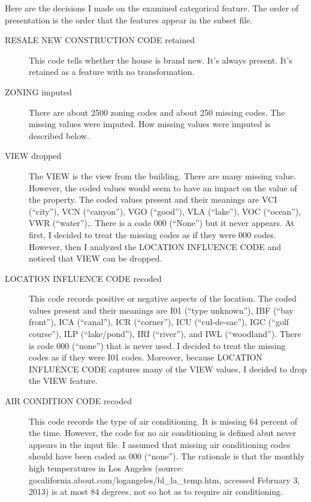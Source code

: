 Here are the decisions I made on the examined categorical
feature. The order of presentation is the order that the features
appear in the subset file.
\begin{description}

\item[RESALE NEW CONSTRUCTION CODE retained] This code tells whether
  the house is brand new. It's always present. It's retained as a
  feature with no transformation.

\item[ZONING imputed] There are about 2500 zoning codes and about 250 missing
  codes. The missing values were imputed. How missing values were imputed
  is described below.

\item[VIEW dropped] The VIEW is the view from the building. There are
  many missing value. However, the coded values would seem to have an
  impact on the value of the property. The coded values present and
  their meanings are VCI (``city''), VCN (``canyon''), VGO (``good''),
  VLA (``lake''), VOC (``ocean''), VWR (``water''),. There is a code
  000 (``None'') but it never appears. At first, I decided to treat
  the missing codes as if they were 000 codes. However, then I
  analyzed the LOCATION INFLUENCE CODE and noticed that VIEW can be
  dropped.

\item[LOCATION INFLUENCE CODE recoded] This code records positive or
  negative aspects of the location. The coded values present and their
  meanings are I01 (``type unknown''), IBF (``bay front''), ICA
  (``canal''), ICR (``corner''), ICU (``cul-de-sac''), IGC (``golf
  course''), ILP (``lake/pond''), IRI (``river''), and IWL
  (``woodland''). There is code 000 (``none'') that is never used. I
  decided to treat the missing codes as if they were I01
  codes. Moreover, because LOCATION INFLUENCE CODE captures many of
  the VIEW values, I decided to drop the VIEW feature.

\item[AIR CONDITION CODE recoded] This code records the type of air
  conditioning. It is missing 64 percent of the time. However, the
  code for no air conditioning is defined abut never appears in the
  input file. I assumed that missing air conditioning codes should
  have been coded as 000 (``none''). The rationale is that the monthly
  high temperatures in Los Angeles (source:
  gocalifornia.about.com/logangeles/bl\_la\_temp.htm, accessed February
  3, 2013) is at most 84 degrees, not so hot as to require air
  conditioning.


\end{description}
